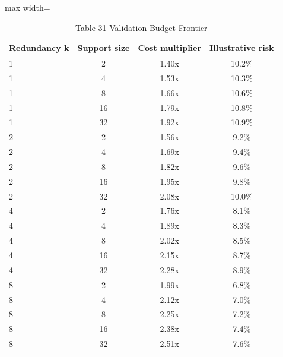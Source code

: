 \begin{table}[tbp]
\centering
\footnotesize
\caption{Table 31 Validation Budget Frontier}
\label{tab:table_31_validation_budget_frontier}
\begin{adjustbox}{max width=\linewidth}
\begin{tabular}{lccc}
\toprule
Redundancy k & Support size & Cost multiplier & Illustrative risk \\
\midrule
1 & 2 & 1.40x & 10.2\% \\
1 & 4 & 1.53x & 10.3\% \\
1 & 8 & 1.66x & 10.6\% \\
1 & 16 & 1.79x & 10.8\% \\
1 & 32 & 1.92x & 10.9\% \\
2 & 2 & 1.56x & 9.2\% \\
2 & 4 & 1.69x & 9.4\% \\
2 & 8 & 1.82x & 9.6\% \\
2 & 16 & 1.95x & 9.8\% \\
2 & 32 & 2.08x & 10.0\% \\
4 & 2 & 1.76x & 8.1\% \\
4 & 4 & 1.89x & 8.3\% \\
4 & 8 & 2.02x & 8.5\% \\
4 & 16 & 2.15x & 8.7\% \\
4 & 32 & 2.28x & 8.9\% \\
8 & 2 & 1.99x & 6.8\% \\
8 & 4 & 2.12x & 7.0\% \\
8 & 8 & 2.25x & 7.2\% \\
8 & 16 & 2.38x & 7.4\% \\
8 & 32 & 2.51x & 7.6\% \\
\bottomrule
\end{tabular}
\end{adjustbox}
\end{table}
